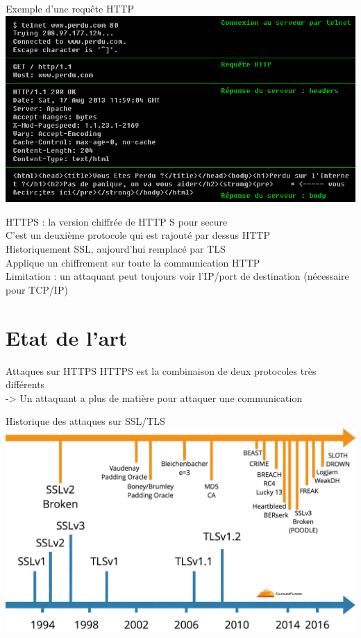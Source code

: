 \documentclass{beamer}
\begin{document}
\begin{frame}{Exemple d'une requête HTTP}
    \includegraphics[scale=0.50]{../medias/perdu.png}
\end{frame}

\begin{frame}{HTTPS : la version chiffrée de HTTP}
    S pour secure \\
    C'est un deuxième protocole qui est rajouté par dessus HTTP \\
    Historiquement SSL, aujourd'hui remplacé par TLS \\
    Applique un chiffrement sur toute la communication HTTP \\

    Limitation : un attaquant peut toujours voir l'IP/port de destination (nécessaire pour TCP/IP)
\end{frame}


\section{Etat de l'art}

\begin{frame}{Attaques sur HTTPS}
    HTTPS est la combinaison de deux protocoles très différents \\
    -> Un attaquant a plus de matière pour attaquer une communication \\
    
\end{frame}

\begin{frame}{Historique des attaques sur SSL/TLS}
    \includegraphics[scale=0.19]{../medias/history-tls-attacks.png}
\end{frame}
\end{document}
